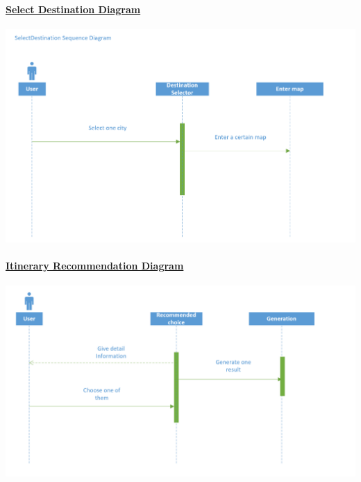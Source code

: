 \documentclass[10pt]{article}
\begin{document}
	\paragraph{\underline{Select Destination Diagram}}
	\begin{center}
	
		\includegraphics[width=14cm]{4.png} 
	\end{center}

	\paragraph{\underline{Itinerary Recommendation Diagram}}
	\begin{center}
	
		\includegraphics[width=14cm]{5.png} 
	\end{center}
\end{document}
